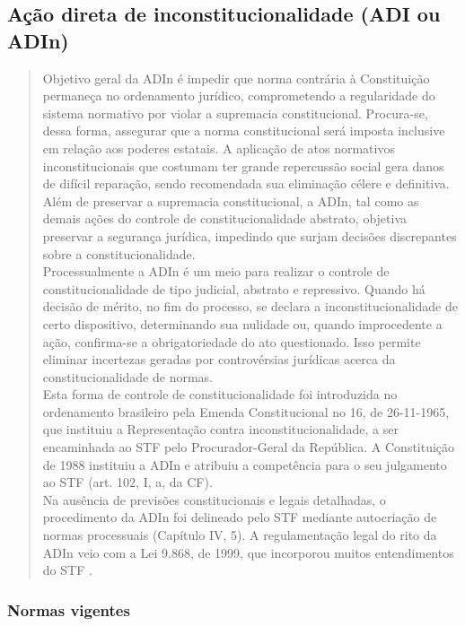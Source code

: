 \documentclass{article}
\begin{document}
\subsection{Ação direta de inconstitucionalidade (ADI ou ADIn)}

\begin{quote}
    Objetivo geral da ADIn é impedir que norma contrária à Constituição permaneça no ordenamento jurídico, comprometendo a regularidade do sistema normativo por violar a supremacia constitucional. Procura-se, dessa forma, assegurar que a norma constitucional será imposta inclusive em relação aos poderes estatais. A aplicação de atos normativos inconstitucionais que costumam ter grande repercussão social gera danos de difícil reparação, sendo recomendada sua eliminação célere e definitiva.\\
    Além de preservar a supremacia constitucional, a ADIn, tal como as demais ações do controle de constitucionalidade abstrato, objetiva preservar a segurança jurídica, impedindo que surjam decisões discrepantes sobre a constitucionalidade.\\
    Processualmente a ADIn é um meio para realizar o controle de constitucionalidade de tipo judicial, abstrato e repressivo. Quando há decisão de mérito, no fim do processo, se declara a inconstitucionalidade de certo dispositivo, determinando sua nulidade ou, quando improcedente a ação, confirma-se a obrigatoriedade do ato questionado. Isso permite eliminar incertezas geradas por controvérsias jurídicas acerca da constitucionalidade de normas.\\
    Esta forma de controle de constitucionalidade foi introduzida no ordenamento brasileiro pela Emenda Constitucional no 16, de 26-11-1965, que instituiu a Representação contra inconstitucionalidade, a ser encaminhada ao STF pelo Procurador-Geral da República. A Constituição de 1988 instituiu a ADIn e atribuiu a competência para o seu julgamento ao STF (art. 102, I, a, da CF).\\
    Na ausência de previsões constitucionais e legais detalhadas, o procedimento da ADIn foi delineado pelo STF mediante autocriação de normas processuais (Capítulo IV, 5). A regulamentação legal do rito da ADIn veio com a Lei 9.868, de 1999, que incorporou muitos entendimentos do STF \cite[pp. 104-105]{dimoulis_curso_2016}.
\end{quote}

\subsubsection{Normas vigentes}
\end{document}
